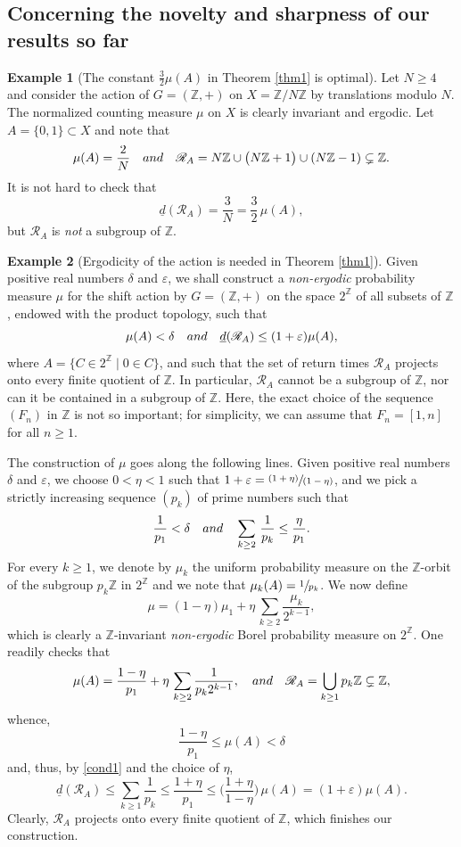 \documentclass[11pt]{article}
\newcommand{\Subsection}{\subsection}
\numberwithin{equation}{section}
\let\mathcal\mathscr
\newcommand{\pspfrac}[2]{\sfrac{(#1)}{(#2)}}
\newcommand{\cR}{\mathcal{R}}
\newcommand{\bZ}{\mathbb{Z}}
\newcommand{\qand}{\quad\textup{and}\quad}
\let\eps\varepsilon
\theoremstyle{plain}
\theoremstyle{definition}
\newtheorem{example}{Example}[section]
\begin{document}
\Subsection{Concerning the novelty and sharpness of our results so far}

\begin{example}[The constant $\frac{3}{2} \mu(A)$ in Theorem \ref{thm1} is optimal]
Let $N \geq 4$ and consider the action of $G = (\bZ,+)$ on $X = \bZ/N\bZ$ by translations modulo $N$. The normalized counting measure $\mu$
on $X$ is clearly invariant and ergodic. Let \hbox{$A\!=\!\{0,1\}\!\subset\!X$} and note that
\[
\mu(A) = \frac{2}{N} \qand \cR_{A} = N \bZ \cup \bigl(N\bZ + 1\bigr) \cup (N\bZ - 1) \subsetneq \bZ.
\]
It is not hard to check that
\[
\underline{d}(\cR_A) = \frac{3}{N} = \frac{3}{2}\, \mu(A),
\]
but $\cR_A$ is \emph{not} a subgroup of $\bZ$.
\end{example}

\begin{example}[Ergodicity of the action is needed in Theorem \ref{thm1}]
Given positive real numbers $\delta$ and $\eps$, we shall construct a \emph{non-ergodic} probability measure
$\mu$ for the shift action by $G = (\bZ,+)$ on the space $2^\bZ$ of all subsets of $\bZ$, endowed with the product topology, such that
\[
\mu(A) < \delta \qand \underline{d}(\cR_A) \leq (1+\eps)\mu(A),
\]
where $A = \{ C \in 2^\bZ \mid  0 \in C\}$, and such that the set of return times $\cR_A$ projects onto every finite quotient of $\bZ$. In
particular, $\cR_A$ cannot be a subgroup of $\bZ$, nor can it be contained in a subgroup of $\bZ$.
Here, the exact choice of the sequence $(F_n)$ in $\bZ$ is not so important; for simplicity, we can assume that $F_n = [1,n]$ for all $n \geq 1$.

The construction of $\mu$ goes along the following lines. Given positive real numbers~$\delta$ and $\eps$, we choose $0 < \eta < 1$ such that
$1 + \eps = \pspfrac{1+\eta}{1-\eta}$, and we pick a strictly increasing sequence $(p_k)$ of prime numbers such that
\begin{equation}
\label{cond1}
\frac{1}{p_1} < \delta \qand \sum_{k \geq 2} \, \frac{1}{p_k} \leq \frac{\eta}{p_1}.
\end{equation}
For every $k \geq 1$, we denote by $\mu_k$ the uniform probability measure on the $\bZ$-orbit of the subgroup $p_k \bZ$ in $2^{\bZ}$ and we note
that $\mu_k(A) = \sfrac{1}{p_k}$. We now define
\[
\mu = (1-\eta)\mu_1 + \eta \, \sum_{k \geq 2} \frac{\mu_k}{2^{k-1}},
\]
which is clearly a $\bZ$-invariant \emph{non-ergodic} Borel probability measure on $2^{\bZ}$. One readily checks that
\[
\mu(A) = \frac{1-\eta}{p_1} + \eta \, \sum_{k \geq 2} \frac{1}{p_k 2^{k-1}},
\qand
\cR_A = \bigcup_{k \geq 1} p_k \bZ \subsetneq \bZ,
\]
whence,
\[
\frac{1-\eta}{p_1} \leq \mu(A) < \delta
\]
and, thus, by \eqref{cond1} and the choice of $\eta$,
\[
\underline{d}(\cR_A) \leq \sum_{k \geq 1} \frac{1}{p_k} \leq \frac{1+\eta}{p_1} \leq \Big( \frac{1+\eta}{1-\eta} \Big) \, \mu(A) = (1+\eps)\mu(A).
\]
Clearly, $\cR_A$ projects onto every finite quotient of $\bZ$, which finishes our construction.
\end{example}
\end{document}
